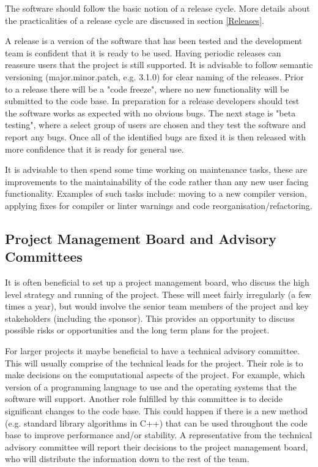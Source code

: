 \documentclass[jnr]{iosart2x}
\begin{document}
The software should follow the basic notion of a release cycle. More details about the practicalities of a release cycle are discussed in section \ref{Releases}.

A release is a version of the software that has been tested and the development team is confident that it is ready to be used.
Having periodic releases can reassure users that the project is still supported.
It is advisable to follow semantic versioning \cite{Semantic_Versioning} (major.minor.patch, e.g. 3.1.0) for clear naming of the releases.
Prior to a release there will be a "code freeze", where no new functionality will be submitted to the code base.
In preparation for a release developers should test the software works as expected with no obvious bugs.
The next stage is "beta testing", where a select group of users are chosen and they test the software and report any bugs.
Once all of the identified bugs are fixed it is then released with more confidence that it is ready for general use.

It is advisable to then spend some time working on maintenance tasks, these are improvements to the maintainability of the code rather than any new user facing functionality.
Examples of such tasks include: moving to a new compiler version, applying fixes for compiler or linter warnings and code reorganisation/refactoring.

\subsection{Project Management Board and Advisory Committees}
\label{PM big}

It is often beneficial to set up a project management board, who discuss the high level strategy and running of the project.
These will meet fairly irregularly (a few times a year), but would involve the senior team members of the project and key stakeholders (including the sponsor).
This provides an opportunity to discuss possible risks or opportunities and the long term plans for the project.

For larger projects it maybe beneficial to have a technical advisory committee.
This will usually comprise of the technical leads for the project.
Their role is to make decisions on the computational aspects of the project.
For example, which version of a programming language to use and the operating systems that the software will support.
Another role fulfilled by this committee is to decide significant changes to the code base.
This could happen if there is a new method (e.g. standard library algorithms in C++) that can be used throughout the code base to improve performance and/or stability.
A representative from the technical advisory committee will report their decisions to the project management board, who will distribute the information down to the rest of the team.
\end{document}
